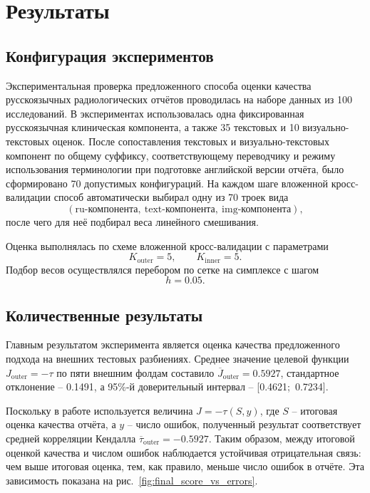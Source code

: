 
\section{Результаты}

\subsection{Конфигурация экспериментов}

Экспериментальная проверка предложенного способа оценки качества русскоязычных радиологических отчётов проводилась на наборе данных из 100 исследований. В экспериментах использовалась одна фиксированная русскоязычная клиническая компонента, а также 35 текстовых и 10 визуально-текстовых оценок. После сопоставления текстовых и визуально-текстовых компонент по общему суффиксу, соответствующему переводчику и режиму использования терминологии при подготовке английской версии отчёта, было сформировано 70 допустимых конфигураций. На каждом шаге вложенной кросс-валидации способ автоматически выбирал одну из 70 троек вида
\[
(\text{ru-компонента},\ \text{text-компонента},\ \text{img-компонента}),
\]
после чего для неё подбирал веса линейного смешивания.

Оценка выполнялась по схеме вложенной кросс-валидации с параметрами
\[
K_{\mathrm{outer}} = 5,\qquad K_{\mathrm{inner}} = 5.
\]
Подбор весов осуществлялся перебором по сетке на симплексе с шагом
\[
h = 0.05.
\]

\subsection{Количественные результаты}

Главным результатом эксперимента является оценка качества предложенного подхода на внешних тестовых разбиениях. Среднее значение целевой функции $J_{\mathrm{outer}} = -\tau$ по пяти внешним фолдам составило $\overline{J}_{\mathrm{outer}} = 0.5927$, стандартное отклонение -- 0.1491, а 95\%-й доверительный интервал -- [0.4621;\ 0.7234].

Поскольку в работе используется величина $J = -\tau\!\left(S, y\right)$, где \(S\) -- итоговая оценка качества отчёта, а \(y\) -- число ошибок, полученный результат соответствует средней корреляции Кендалла \(\overline{\tau}_{\mathrm{outer}} = -0.5927\).
Таким образом, между итоговой оценкой качества и числом ошибок наблюдается устойчивая отрицательная связь: чем выше итоговая оценка, тем, как правило, меньше число ошибок в отчёте. Эта зависимость показана на рис.~\ref{fig:final_score_vs_errors}.

